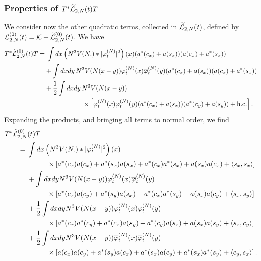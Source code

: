\documentclass[11pt,a4paper]{article}
\newcommand{\wt}{\widetilde}
\newcommand{\cK}{{\cal K}}
\newcommand{\cL}{{\cal L}}
\begin{document}
\subsubsection{Properties of $T^* \wt{\cL}_{2,N} (t) T$}

We consider now the other quadratic terms, collected in $\wt{\cL}_{2,N} (t)$, defined by $\cL^{(0)}_{2,N} (t) = \cK + \wt{\cL}_{2,N}^{(0)} (t)$. 
We have
\[ \begin{split} 
T^* \wt{\cL}_{2,N}^{(0)} (t) T = & \; \int dx \left( N^3 V (N .) * |\varphi_t^{(N)}|^2 \right) (x) (a^* (c_x) + a(s_x)) (a(c_x) + a^* (s_x)) \\ & + \int dx dy \, N^3 V(N(x-y)) \varphi_t^{(N)} (x) \overline{\varphi}_t^{(N)} (y) (a^* (c_x) + a(s_x)) (a (c_x) + a^* (s_x)) \\ &+ \frac{1}{2} \int dx dy \, N^3 V(N (x-y)) \\
&\hspace{2cm} \times \left[  \varphi_t^{(N)} (x) \varphi_t^{(N)} (y) (a^* (c_x) + a(s_x)) (a^* (c_y) + a (s_y)) + \text{h.c.}  \right]. 
\end{split} \]
Expanding the products, and bringing all terms to normal order, we find
\begin{equation}\label{eq:T2T} \begin{split} 
T^*  \wt{\cL}_{2,N}^{(0)}& (t) T \\ =\; & \int dx \left(N^3 V (N .) * |\varphi_t^{(N)}|^2 \right) (x) \\ &\hspace{1cm}\times \left[  a^* (c_x) a (c_x) + a^* (s_x) a (s_x) + a^* (c_x) a^* (s_x) + a(s_x) a(c_x) + \langle s_x , s_x \rangle \right] \\
&+ \int dx dy N^3 V (N (x-y)) \varphi_t^{(N)} (x) \overline{\varphi}_t^{(N)} (y) \\ &\hspace{1cm}\times  \left[ a^* (c_x) a(c_y) + a^* (s_y) a(s_x) + a^* (c_x) a^* (s_y) + a(s_x) a(c_y) + \langle s_x , s_y \rangle \right] \\
&+ \frac{1}{2} \int dx dy N^3 V(N (x-y)) \varphi_t^{(N)} (x) \varphi_t^{(N)} (y) \\ &\hspace{1cm}\times \left[ a^* (c_x) a^* (c_y) + a^* (c_x) a(s_y) + a^* (c_y) a (s_x) + a(s_x) a(s_y) + \langle s_x , c_y \rangle \right] \\
&+ \frac{1}{2} \int dx dy N^3 V(N (x-y)) \overline{\varphi}_t^{(N)} (x) \overline{\varphi}_t^{(N)} (y) \\ &\hspace{1cm}\times \left[ a (c_x) a (c_y) + a^* (s_y) a(c_x) +  a^* (s_x) a(c_y) + a^* (s_x) a^* (s_y) + \langle c_y , s_x \rangle \right]. 
\end{split} \end{equation}
\end{document}
